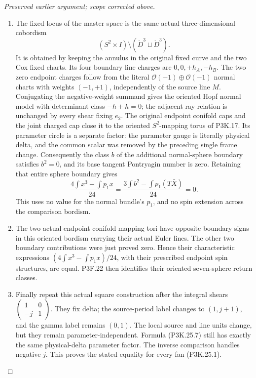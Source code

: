 \begin{proof}[Preserved earlier argument; scope corrected above]
\begin{enumerate}[label=\arabic*.]
\item The fixed locus of the master space is the same actual
three-dimensional cobordism
\[
 (S^2\times I)\setminus
                   (\mathring D^3\sqcup\mathring D^3).
\]
It is obtained by keeping the annulus in the original fixed
curve and the two Cox fixed charts. Its four boundary
line charges are \(0,0,+h_A,-h_B\).
The two zero endpoint charges follow from the literal
\(\mathcal O(-1)\oplus\mathcal O(-1)\) normal charts with
weights \((-1,+1)\), independently of the source line \(M\).
Conjugating the negative-weight summand gives the oriented
Hopf normal model with determinant class
\(-h+h=0\); the adjacent ray relation is unchanged by
every shear fixing \(e_2\).
The original endpoint conifold caps and the joint charged
cap close it to the oriented \(S^2\)-mapping torus of P3K.17.
Its parameter circle is a separate factor: the parameter
gauge is literally physical delta, and the common scalar was
removed by the preceding single frame change. Consequently
the class \(b\) of the additional normal-sphere boundary
satisfies \(b^2=0\), and its base tangent Pontryagin number
is zero. Retaining that entire sphere boundary gives
\[
 \frac{4\int x^3-\int p_1x}{24}
       =\frac{3\int b^2-\int p_1(T\bar X)}{24}=0.
                                                        \tag{P3K.25.10}
\]
This uses no value for the normal bundle's \(p_1\), and no
spin extension across the comparison bordism.

\item The two actual endpoint conifold mapping tori have opposite
boundary signs in this oriented bordism carrying their
actual Euler lines. The other two boundary contributions
were just proved zero. Hence their characteristic expressions
\((4\int x^3-\int p_1x)/24\), with their prescribed endpoint
spin structures, are equal. P3F.22 then identifies their
oriented seven-sphere return classes.

\item Finally repeat this actual square construction after the
integral shears
\(\left(\begin{smallmatrix}1&0\\-j&1\end{smallmatrix}\right)\).
They fix delta; the source-period label changes to
\((1,j+1)\), and the gamma label remains \((0,1)\).
The local source and line units change, but they remain
parameter-independent. Formula (P3K.25.7) still has exactly
the same physical-delta parameter factor. The inverse
comparison handles negative \(j\). This proves the stated
equality for every fan (P3K.25.1).

\end{enumerate}
\end{proof}